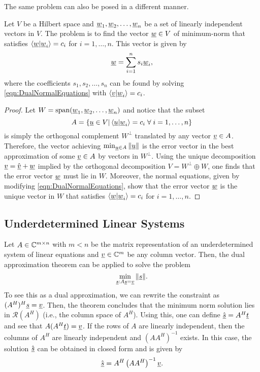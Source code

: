 The same problem can also be posed in a different manner.
\begin{theorem}
Let $V$ be a Hilbert space and $\underline{w}_1 ,\underline{w}_2 , \ldots, \underline{w}_n$ be a set of linearly independent vectors in $V$.
The  problem is to find the vector $\underline{w}\in V$ of minimum-norm that satisfies $\left\langle \underline{w} | \underline{w}_i \right\rangle = c_i$ for $i=1,\ldots,n$.
This vector is given by
\[ \underline{w} = \sum_{i=1}^n s_i \underline{w}_i, \]
where the coefficients  $s_1,s_2,\ldots,s_n$ can be found by solving \eqref{eqn:DualNormalEquations} with $\left\langle \underline{v} | \underline{w}_i \right\rangle = c_i$.
\end{theorem}
\begin{proof}
Let $W = \mathrm{span}(\underline{w}_1 ,\underline{w}_2 , \ldots, \underline{w}_n)$ and notice that the subset
\[ A = \{ \underline{u} \in V | \left\langle \underline{u} | \underline{w}_i \right\rangle = c_i\; \forall\; i=1,\ldots,n \} \]
is simply the orthogonal complement $W^{\bot}$ translated by any vector $\underline{v}\in A$.
Therefore, the vector achieving $\min_{\underline{u}\in A} \| \underline{u} \|$ is the error vector in the best approximation of some $\underline{v}\in A$ by vectors in $W^{\bot}$.
Using the unique decomposition $\underline{v} = \hat{\underline{v}} + \underline{w}$ implied by the orthogonal decomposition $V = W^{\bot} \oplus W$, one finds that the error vector $\underline{w}$ must lie in $W$.
Moreover, the normal equations, given by modifying \eqref{eqn:DualNormalEquations}, show that the error vector $\underline{w}$ is the unique vector in $W$ that satisfies $\left\langle \underline{w} | \underline{w}_i \right\rangle = c_i$ for $i=1,\ldots,n$.
\end{proof}

\subsection{Underdetermined Linear Systems}

Let $A \in \mathbb{C}^{m\times n}$ with $m<n$ be the matrix representation of an underdetermined system of linear equations and $\underline{v} \in \mathbb{C}^m$ be any column vector.
Then, the dual approximation theorem can be applied to solve the problem
\[ \min_{\underline{s} : A\underline{s} = \underline{v}} \| \underline{s} \| . \]
To see this as a dual approximation, we can rewrite the constraint as $(A^H)^H \underline{s} = \underline{v}$.
Then, the theorem concludes that the minimum norm solution lies in $\mathcal{R}(A^H)$ (i.e., the column space of $A^H$).
Using this, one can define $\hat{\underline{s}} = A^H \underline{t}$ and see that $A (A^H \underline{t}) = \underline{v}$.
If the rows of $A$ are linearly independent, then the columns of $A^H$ are linearly independent and $(A A^H)^{-1}$ exists.
In this case, the solution $\hat{\underline{s}}$ can be obtained in closed form and is given by
\[ \hat{\underline{s}} = A^H \left( A A^H \right)^{-1} \underline{v}. \]


